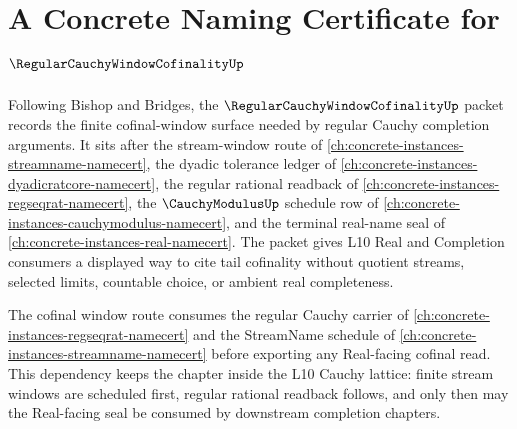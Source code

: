 \chapter{A Concrete Naming Certificate for $\RegularCauchyWindowCofinalityUp$}
\label{ch:concrete-instances-regular-cauchy-window-cofinality-namecert}

Following Bishop and Bridges, the $\RegularCauchyWindowCofinalityUp$ packet records the finite cofinal-window surface needed by regular Cauchy completion arguments. It sits after the stream-window route of \autoref{ch:concrete-instances-streamname-namecert}, the dyadic tolerance ledger of \autoref{ch:concrete-instances-dyadicratcore-namecert}, the regular rational readback of \autoref{ch:concrete-instances-regseqrat-namecert}, the $\CauchyModulusUp$ schedule row of \autoref{ch:concrete-instances-cauchymodulus-namecert}, and the terminal real-name seal of \autoref{ch:concrete-instances-real-namecert}. The packet gives L10 Real and Completion consumers a displayed way to cite tail cofinality without quotient streams, selected limits, countable choice, or ambient real completeness.

The cofinal window route consumes the regular Cauchy carrier of \autoref{ch:concrete-instances-regseqrat-namecert} and the StreamName schedule of \autoref{ch:concrete-instances-streamname-namecert} before exporting any Real-facing cofinal read. This dependency keeps the chapter inside the L10 Cauchy lattice: finite stream windows are scheduled first, regular rational readback follows, and only then may the Real-facing seal be consumed by downstream completion chapters.

